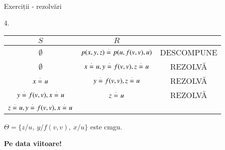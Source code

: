 \documentclass[xcolor=pdftex,romanian,colorlinks]{beamer}
\begin{document}
\begin{frame}{Exerciții - rezolvări}

{\footnotesize
4.

\begin{tabular}{|c|c|c|}
\hline
$S$ & $R$ & \\ \hline 
$\emptyset$ & $p(x, y, z) \stackrel{\cdot}{=}_{} p(u, f(v,v), u)$ & DESCOMPUNE \\ \hline  
$\emptyset$ & $x \stackrel{\cdot}{=}_{} u, y \stackrel{\cdot}{=}_{} f(v,v),  z \stackrel{\cdot}{=}_{} u$ & REZOLV\u A \\ \hline  
$x \stackrel{\cdot}{=}_{} u$ & $y \stackrel{\cdot}{=}_{} f(v,v),  z \stackrel{\cdot}{=}_{} u$ & REZOLV\u A \\ \hline  
$y \stackrel{\cdot}{=}_{} f(v,v), x \stackrel{\cdot}{=}_{} u$ & $z \stackrel{\cdot}{=}_{} u$ & REZOLV\u A \\ \hline  
$ z \stackrel{\cdot}{=}_{} u, y \stackrel{\cdot}{=}_{} f(v,v), x \stackrel{\cdot}{=}_{} u$ &  &  \\ \hline  
\end{tabular}

$\Theta = \{ z / u,\ y / f(v,v), \ x / u \}$ este cmgu.

}
\end{frame}

\begin{frame}
  \vfill
  \centering

\textbf{Pe data viitoare!}

  \vfill
\end{frame}
\end{document}
